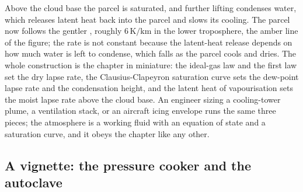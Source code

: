 Above the cloud base the parcel is saturated, and further lifting condenses
water, which releases latent heat back into the parcel and slows its
cooling. The parcel now follows the gentler , roughly $6\,\si{\kelvin}/\text{km}$ in the lower troposphere, the
amber line of the figure; the rate is not constant because the latent-heat
release depends on how much water is left to condense, which falls as the
parcel cools and dries. The whole construction is the chapter in miniature:
the ideal-gas law and the first law set the dry lapse rate, the
Clausius-Clapeyron saturation curve sets the dew-point lapse rate and the
condensation height, and the latent heat of vapourisation sets the moist
lapse rate above the cloud base. An engineer sizing a cooling-tower plume, a
ventilation stack, or an aircraft icing envelope runs the same three pieces;
the atmosphere is a working fluid with an equation of state and a saturation
curve, and it obeys the chapter like any other.



\subsection{A vignette: the pressure cooker and the autoclave}

